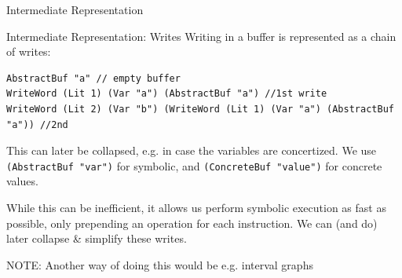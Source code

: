 \documentclass[aspectratio=169]{beamer}
\begin{document}
\begin{frame}[fragile]{Intermediate Representation}

\end{frame}


\begin{frame}[fragile=singleslide]{Intermediate Representation: Writes}
Writing in a buffer is represented as a chain of writes:
\begin{Verbatim}[frame=single, framerule=0.2mm, framesep=2mm,fontsize=\small]
AbstractBuf "a" // empty buffer
WriteWord (Lit 1) (Var "a") (AbstractBuf "a") //1st write
WriteWord (Lit 2) (Var "b") (WriteWord (Lit 1) (Var "a") (AbstractBuf "a")) //2nd
\end{Verbatim}
This can later be collapsed, e.g. in case the variables are concertized. We use \texttt{(AbstractBuf "var")} for symbolic, and \texttt{(ConcreteBuf "value")} for concrete values.
\bigskip

While this can be inefficient, it allows us perform symbolic execution as fast as possible, only prepending an operation for each instruction. We can (and do) later collapse \& simplify these writes.
\bigskip

NOTE: Another way of doing this would be e.g. interval graphs
\end{frame}
\end{document}
